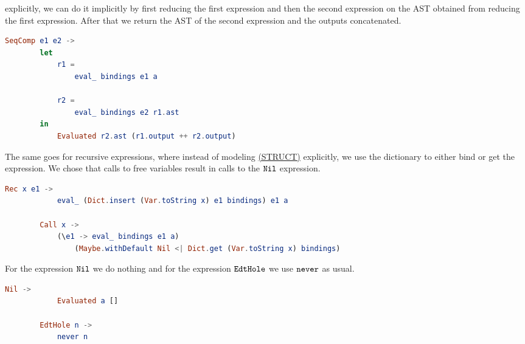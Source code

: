 explicitly, we can do it implicitly by first reducing the first expression
and then the second expression on the AST obtained from reducing the first
expression. After that we return the AST of the second expression and the
outputs concatenated.
\begin{lstlisting}[language=elm,%
                   label="edt-eval_-seqcomp",%
                   gobble=4,%
                   ]
    SeqComp e1 e2 ->
        let
            r1 =
                eval_ bindings e1 a

            r2 =
                eval_ bindings e2 r1.ast
        in
            Evaluated r2.ast (r1.output ++ r2.output)
\end{lstlisting}
The same goes for recursive expressions, where instead of modeling
\hyperref[fig:edtreductionrules]{(STRUCT)} explicitly, we use the dictionary to
either bind or get the expression. We chose that calls to free variables
result in calls to the $\texttt{Nil}$ expression.
\begin{lstlisting}[language=elm,%
                   label="edt-eval_-rec",%
                   gobble=8,%
                   ]
        Rec x e1 ->
            eval_ (Dict.insert (Var.toString x) e1 bindings) e1 a

        Call x ->
            (\e1 -> eval_ bindings e1 a)
                (Maybe.withDefault Nil <| Dict.get (Var.toString x) bindings)
\end{lstlisting}
For the expression $\texttt{Nil}$ we do nothing and for the expression
$\texttt{EdtHole}$ we use $\texttt{never}$ as usual.
\begin{lstlisting}[language=elm,%
                   label="edt-eval_-nil",%
                   gobble=8,%
                   ]
        Nil ->
            Evaluated a []

        EdtHole n ->
            never n
\end{lstlisting}

